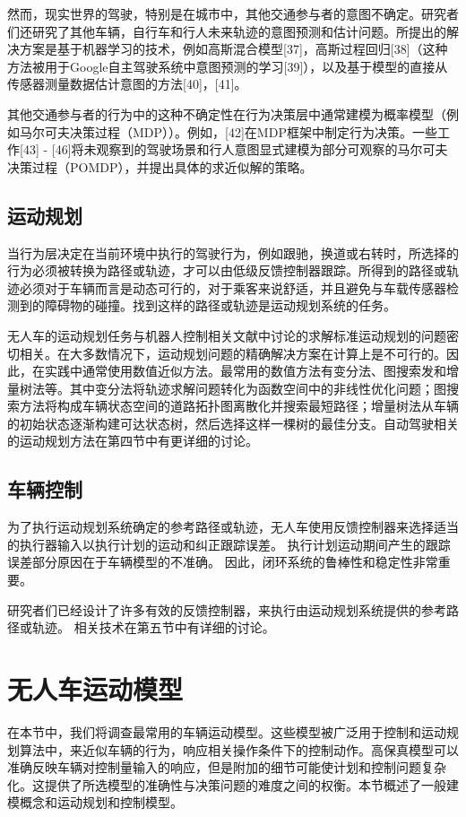 然而，现实世界的驾驶，特别是在城市中，其他交通参与者的意图不确定。研究者们还研究了其他车辆，自行车和行人未来轨迹的意图预测和估计问题。所提出的解决方案是基于机器学习的技术，例如高斯混合模型[37]，高斯过程回归[38]（这种方法被用于Google自主驾驶系统中意图预测的学习[39]），以及基于模型的直接从传感器测量数据估计意图的方法[40]，[41]。

其他交通参与者的行为中的这种不确定性在行为决策层中通常建模为概率模型（例如马尔可夫决策过程（MDP））。例如，[42]在MDP框架中制定行为决策。一些工作[43] - [46]将未观察到的驾驶场景和行人意图显式建模为部分可观察的马尔可夫决策过程（POMDP），并提出具体的求近似解的策略。

\subsection{运动规划}
当行为层决定在当前环境中执行的驾驶行为，例如跟驰，换道或右转时，所选择的行为必须被转换为路径或轨迹，才可以由低级反馈控制器跟踪。所得到的路径或轨迹必须对于车辆而言是动态可行的，对于乘客来说舒适，并且避免与车载传感器检测到的障碍物的碰撞。找到这样的路径或轨迹是运动规划系统的任务。

无人车的运动规划任务与机器人控制相关文献中讨论的求解标准运动规划的问题密切相关。在大多数情况下，运动规划问题的精确解决方案在计算上是不可行的。因此，在实践中通常使用数值近似方法。最常用的数值方法有变分法、图搜索发和增量树法等。其中变分法将轨迹求解问题转化为函数空间中的非线性优化问题；图搜索方法将构成车辆状态空间的道路拓扑图离散化并搜索最短路径；增量树法从车辆的初始状态逐渐构建可达状态树，然后选择这样一棵树的最佳分支。自动驾驶相关的运动规划方法在第四节中有更详细的讨论。

\subsection{车辆控制}
为了执行运动规划系统确定的参考路径或轨迹，无人车使用反馈控制器来选择适当的执行器输入以执行计划的运动和纠正跟踪误差。 执行计划运动期间产生的跟踪误差部分原因在于车辆模型的不准确。 因此，闭环系统的鲁棒性和稳定性非常重要。

研究者们已经设计了许多有效的反馈控制器，来执行由运动规划系统提供的参考路径或轨迹。 相关技术在第五节中有详细的讨论。

\section{无人车运动模型}
在本节中，我们将调查最常用的车辆运动模型。这些模型被广泛用于控制和运动规划算法中，来近似车辆的行为，响应相关操作条件下的控制动作。高保真模型可以准确反映车辆对控制量输入的响应，但是附加的细节可能使计划和控制问题复杂化。这提供了所选模型的准确性与决策问题的难度之间的权衡。本节概述了一般建模概念和运动规划和控制模型。

